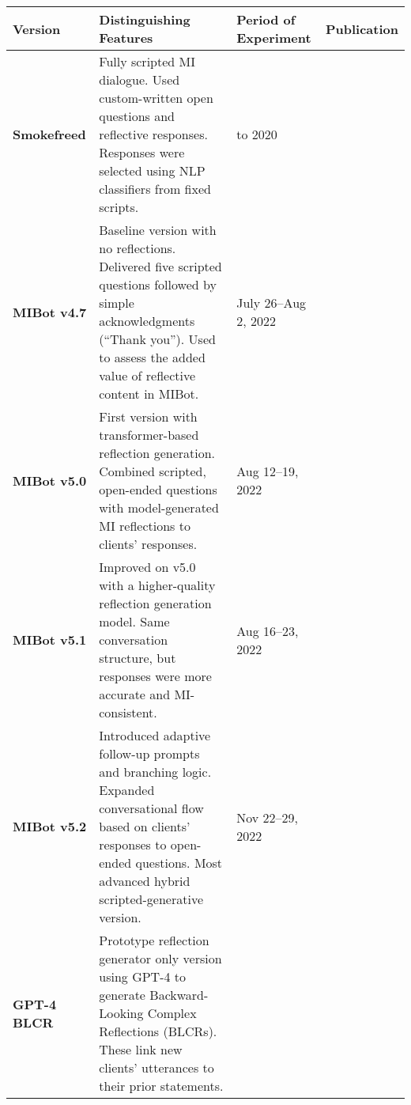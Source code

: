 \begin{table}[!h]
	\small
	\centering
        \begin{tabular}{
                @{}>{\raggedright\arraybackslash}m{}
                >{\raggedright\arraybackslash}m{}
                >{\raggedright\arraybackslash}m{}
                >{\raggedright\arraybackslash}m{}@{}}
		\toprule
		\textbf{Version}     & \textbf{Distinguishing Features}                                                                                                                                                               & \textbf{Period of Experiment}   & \textbf{Publication}     \\
		\midrule
		\arrayrulecolor{gray!50}
		\textbf{Smokefreed}  & Fully scripted MI dialogue. Used custom-written open ques\-tions and reflective responses. Responses were selected using NLP classifiers from fixed scripts.                                     & 2018 to 2020                    & \citet{Almusharraf_2019} \\
		\hline
		\textbf{MIBot v4.7}  & Baseline version with no reflections. Delivered five scripted questions followed by simple acknowledgments (``Thank you''). Used to assess the added value of reflective content in MIBot.     & July 26–Aug 2, 2022             & \citet{brown2023mi}      \\
		\hline
		\textbf{MIBot v5.0}  & First version with transformer-based reflection generation. Combined scripted, open-ended questions with model-generated MI reflections to clients' responses.                                 & Aug 12–19, 2022                 & \citet{brown2023mi}      \\
		\hline
		\textbf{MIBot v5.1}  & Improved on v5.0 with a higher-quality reflection generation model. Same conversation structure, but responses were more accurate and MI-consistent.                                           & Aug 16–23, 2022                 & \citet{brown2023mi}      \\
		\hline
		\textbf{MIBot v5.2}  & Introduced adaptive follow-up prompts and branching logic. Expanded conversational flow based on clients' responses to open-ended questions. Most advanced hybrid scripted-generative version. & Nov 22–29, 2022                 & \citet{brown2023mi}      \\
		\hline
		\textbf{GPT-4 BLCR}  & Prototype reflection generator only version using GPT-4 to generate Backward-Looking Complex Reflections (BLCRs). These link new clients' utterances to their prior statements.

\end{tabular}
\end{table}
